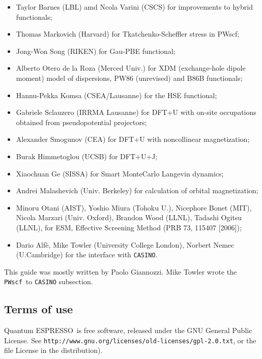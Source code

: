 \documentclass[12pt,a4paper]{article}
\def\PWscf{\texttt{PWscf}}
\def\qe{{\sc Quantum ESPRESSO}}
\begin{document}
\begin{itemize}
  \item Taylor Barnes (LBL) amd Ncola Varini (CSCS) for improvements
        to hybrid functionals;
  \item Thomas Markovich (Harvard) for Tkatchenko-Scheffler stress in PWscf;
  \item Jong-Won Song (RIKEN) for Gau-PBE functional;
  \item Alberto Otero de la Roza (Merced Univ.) for XDM (exchange-hole 
   dipole moment) model of dispersions, PW86 (unrevised) and B86B functionals;
  \item Hannu-Pekka Komsa (CSEA/Lausanne) for the HSE functional;
  \item Gabriele Sclauzero (IRRMA Lausanne) for DFT+U
        with on-site occupations obtained from pseudopotential projectors;
  \item Alexander Smogunov (CEA) for DFT+U with noncollinear magnetization;
  \item Burak Himmetoglou (UCSB) for DFT+U+J;
  \item Xiaochuan Ge (SISSA) for Smart MonteCarlo Langevin dynamics;
  \item Andrei Malashevich (Univ. Berkeley) for calculation of orbital
        magnetization;
  \item Minoru Otani (AIST), Yoshio Miura (Tohoku U.), 
        Nicephore Bonet (MIT), Nicola Marzari (Univ. Oxford), 
        Brandon Wood (LLNL), Tadashi Ogitsu (LLNL), for ESM,
        Effective Screening Method (PRB 73, 115407 [2006]);
  \item Dario Alf\`e, Mike Towler (University College London), 
        Norbert Nemec (U.Cambridge) for the interface with \texttt{CASINO}.
\end{itemize}



This guide was mostly written by Paolo Giannozzi.
Mike Towler wrote the \PWscf\ to \texttt{CASINO} subsection.

 \subsection{Terms of use}

\qe\ is free software, released under the 
GNU General Public License. See
\texttt{http://www.gnu.org/licenses/old-licenses/gpl-2.0.txt}, 
or the file License in the distribution).
    
\end{document}
